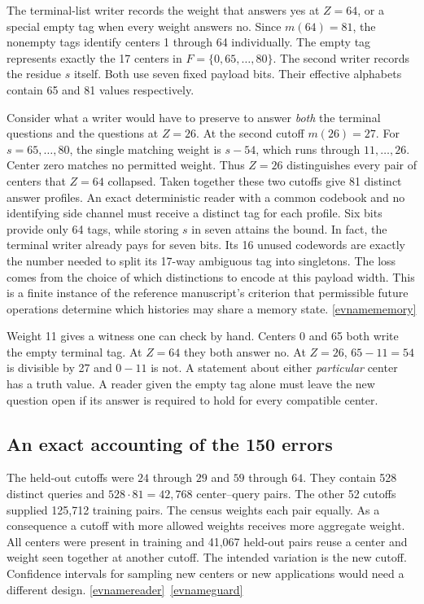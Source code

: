 \documentclass[11pt,letterpaper]{article}
\newcommand{\evref}[1]{\hyperlink{ev-#1}{\textsf{\small[\csname evname#1\endcsname]}}}
\begin{document}
The terminal-list writer records the weight that answers yes at \(Z=64\), or a special empty tag when every weight answers no. Since \(m(64)=81\), the nonempty tags identify centers 1 through 64 individually. The empty tag represents exactly the 17 centers in \(F=\{0,65,\ldots,80\}\). The second writer records the residue \(s\) itself. Both use seven fixed payload bits. Their effective alphabets contain 65 and 81 values respectively.

Consider what a writer would have to preserve to answer \emph{both} the terminal questions and the questions at \(Z=26\). At the second cutoff \(m(26)=27\). For \(s=65,\ldots,80\), the single matching weight is \(s-54\), which runs through \(11,\ldots,26\). Center zero matches no permitted weight. Thus \(Z=26\) distinguishes every pair of centers that \(Z=64\) collapsed. Taken together these two cutoffs give 81 distinct answer profiles. An exact deterministic reader with a common codebook and no identifying side channel must receive a distinct tag for each profile. Six bits provide only 64 tags, while storing \(s\) in seven attains the bound. In fact, the terminal writer already pays for seven bits. Its 16 unused codewords are exactly the number needed to split its 17-way ambiguous tag into singletons. The loss comes from the choice of which distinctions to encode at this payload width. This is a finite instance of the reference manuscript's criterion that permissible future operations determine which histories may share a memory state. \evref{memory}

Weight 11 gives a witness one can check by hand. Centers 0 and 65 both write the empty terminal tag. At \(Z=64\) they both answer no. At \(Z=26\), \(65-11=54\) is divisible by 27 and \(0-11\) is not. A statement about either \emph{particular} center has a truth value. A reader given the empty tag alone must leave the new question open if its answer is required to hold for every compatible center.

\subsection{An exact accounting of the 150 errors}

The held-out cutoffs were \(24\) through \(29\) and \(59\) through \(64\). They contain 528 distinct queries and \(528\cdot81=42{,}768\) center--query pairs. The other 52 cutoffs supplied 125,712 training pairs. The census weights each pair equally. As a consequence a cutoff with more allowed weights receives more aggregate weight. All centers were present in training and 41,067 held-out pairs reuse a center and weight seen together at another cutoff. The intended variation is the new cutoff. Confidence intervals for sampling new centers or new applications would need a different design. \evref{reader}\ \evref{guard}
\end{document}
